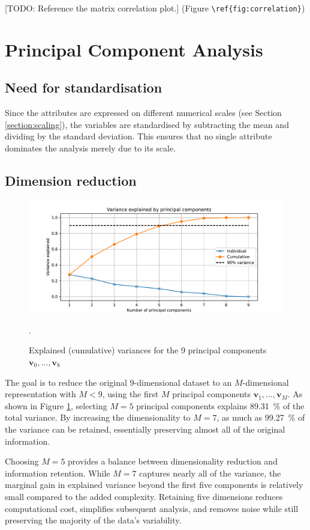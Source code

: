 \documentclass[dtu]{dtuarticle}
\newcommand{\todo}[1]{\color{red}[TODO: #1]\color{black}}
\begin{document}
	\todo{Reference the matrix correlation plot.}  (Figure \verb*|\ref{fig:correlation}|)

	\section{Principal Component Analysis}

	\subsection{Need for standardisation}

	Since the attributes are expressed on different numerical scales (see Section \ref{section:scaling}), the variables are standardised by subtracting the mean and dividing by the standard deviation. This ensures that no single attribute dominates the analysis merely due to its scale.

	\subsection{Dimension reduction}

	\begin{figure}
		\includegraphics[width=.9\textwidth]{figures/pca_explained_variance}
		\caption{Explained (cumulative) variances for the 9 principal components $\bm{v}_0,\ldots,\bm{v}_8$}.
		\label{fig:explained-var}
	\end{figure}

	The goal is to reduce the original 9-dimensional dataset to an $M$-dimensional representation with $M < 9$, using the first $M$ principal components $\bm{v}_1,\ldots,\bm{v}_{M}$. As shown in Figure \ref{fig:explained-var}, selecting $M=5$ principal components explains \SI{89.31}{\percent} of the total variance. By increasing the dimensionality to $M=7$, as much as \SI{99.27}{\percent} of the variance can be retained, essentially preserving almost all of the original information.

	Choosing $M=5$ provides a balance between dimensionality reduction and information retention. While $M=7$ captures nearly all of the variance, the marginal gain in explained variance beyond the first five components is relatively small compared to the added complexity. Retaining five dimensions reduces computational cost, simplifies subsequent analysis, and removes noise while still preserving the majority of the data's variability.
\end{document}
